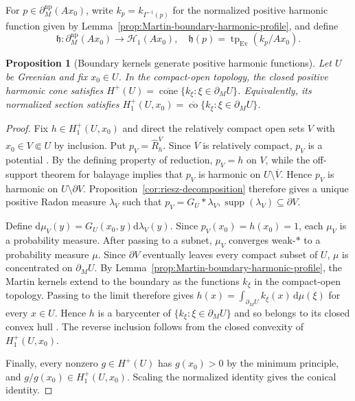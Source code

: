 \documentclass{amsart}
\newtheorem{proposition}[theorem]{Proposition}
\theoremstyle{definition}
\theoremstyle{remark}
\numberwithin{equation}{section}
\begin{document}
For $p\in\partial_M^{\mathrm{np}}(Ax_0)$, write $k_p=k_{\Gamma^{-1}(p)}$ for the normalized positive harmonic function given by Lemma~\ref{prop:Martin-boundary-harmonic-profile}, and define
$$\mathfrak h:\partial_M^{\mathrm{np}}(Ax_0)\longrightarrow\mathscr H_1(Ax_0),\quad
\mathfrak h(p)=\operatorname{tp}_{\operatorname{Ev}}(k_p/Ax_0).$$

\begin{proposition}[Boundary kernels generate positive harmonic functions]
\label{lem:Martin-kernel-generation}
Let $U$ be Greenian and fix $x_0\in U$. In the compact-open topology, the closed positive harmonic cone satisfies
$H^+(U)=\overline{\operatorname{cone}}\{k_\xi:\xi\in\partial_MU\}$.
Equivalently, its normalized section satisfies
$H_1^+(U,x_0)=\overline{\operatorname{co}}\{k_\xi:\xi\in\partial_MU\}$.
\end{proposition}


\begin{proof}
Fix $h\in H_1^+(U,x_0)$ and direct the relatively compact open sets $V$ with $x_0\in V\Subset U$ by inclusion. Put $p_V=\widehat R_h^{\overline V}$. Since $\overline V$ is relatively compact, $p_V$ is a potential \cite[Section~21, Proposition~10]{Brelot1960}.
By the defining property of reduction, $p_V=h$ on $V$, while the
off-support theorem for balayage implies that $p_V$ is harmonic on
$U\setminus\overline V$. Hence $p_V$ is harmonic on
$U\setminus\partial V$. Proposition~\ref{cor:riesz-decomposition} therefore gives a unique
positive Radon measure $\lambda_V$ such that
$p_V=G_U*\lambda_V,
\operatorname{supp}(\lambda_V)\subseteq\partial V.$

Define $\mathrm{d}\mu_V(y)=G_U(x_0,y)\mathrm{d}\lambda_V(y)$.
Since $p_V(x_0)=h(x_0)=1$, each $\mu_V$ is a probability measure.
After passing to a subnet, $\mu_V$ converges weak-$*$ to a probability
measure $\mu$. Since $\partial V$ eventually leaves every compact subset
of $U$, $\mu$ is concentrated on $\partial_MU$. By
Lemma~\ref{prop:Martin-boundary-harmonic-profile}, the Martin kernels
extend to the boundary as the functions $k_\xi$ in the compact-open
topology. Passing to the limit therefore gives
$h(x)=\int_{\partial_MU}k_\xi(x)\,\mathrm{d}\mu(\xi)$ for every $x\in U$.
Hence $h$ is a barycenter of $\{k_\xi:\xi\in\partial_MU\}$ and so belongs
to its closed convex hull \cite[Proposition~1.1]{Phelps2001Choquet}. The reverse inclusion follows from the closed
convexity of $H_1^+(U,x_0)$.

Finally, every nonzero $g\in H^+(U)$ has $g(x_0)>0$ by the minimum
principle, and $g/g(x_0)\in H_1^+(U,x_0)$. Scaling the normalized identity
gives the conical identity.
\end{proof}
\end{document}
